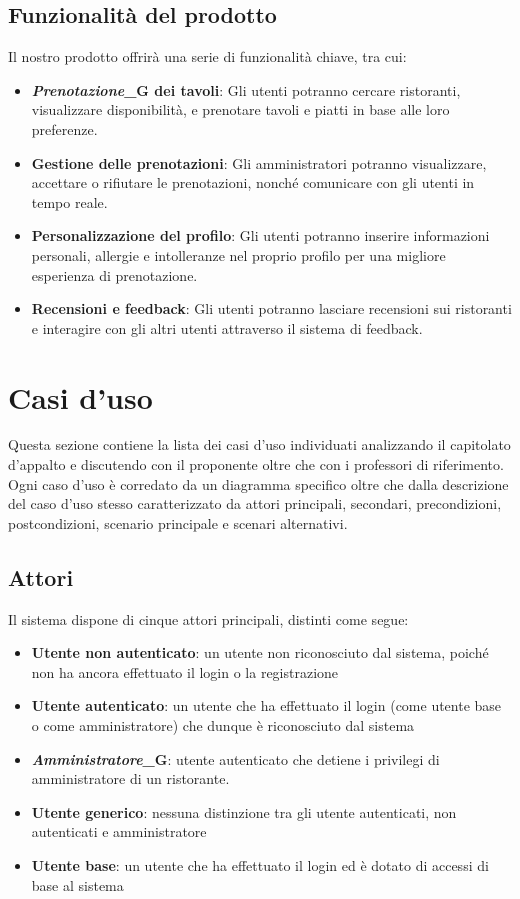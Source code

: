 \documentclass[12pt, oneside]{article}
\begin{document}
\subsection{Funzionalità del prodotto}
Il nostro prodotto offrirà una serie di funzionalità chiave, tra cui:
\begin{itemize}
\item \textbf{\textit{Prenotazione}_G dei tavoli}: Gli utenti potranno cercare ristoranti, visualizzare disponibilità, e prenotare tavoli e piatti in base alle loro preferenze.
\item \textbf{Gestione delle prenotazioni}: Gli amministratori potranno visualizzare, accettare o rifiutare le prenotazioni, nonché comunicare con gli utenti in tempo reale.
\item \textbf{Personalizzazione del profilo}: Gli utenti potranno inserire informazioni personali, allergie e intolleranze nel proprio profilo per una migliore esperienza di prenotazione.
\item \textbf{Recensioni e feedback}: Gli utenti potranno lasciare recensioni sui ristoranti e interagire con gli altri utenti attraverso il sistema di feedback.
\end{itemize}


\newpage

\section{Casi d'uso}
Questa sezione contiene la lista dei casi d'uso individuati analizzando il capitolato d'appalto e discutendo con il proponente oltre che con i professori di riferimento. Ogni caso d'uso è corredato da un diagramma specifico oltre che dalla descrizione del caso d'uso stesso caratterizzato da attori principali, secondari, precondizioni, postcondizioni, scenario principale e scenari alternativi.
\subsection{Attori}
Il sistema dispone di cinque attori principali, distinti come segue:
\begin{itemize}
    \item \textbf{Utente non autenticato}: un utente non riconosciuto dal sistema, poiché non ha ancora  effettuato il login o la registrazione
    \item \textbf{Utente autenticato}: un utente che ha effettuato il login (come utente base o come amministratore) che dunque è riconosciuto dal sistema
    \item \textbf{\textit{Amministratore}_G}: utente autenticato che detiene i privilegi di amministratore di un ristorante.
    \item \textbf{Utente generico}: nessuna distinzione tra gli utente autenticati, non autenticati e amministratore
    \item \textbf{Utente base}: un utente che ha effettuato il login ed è dotato di accessi di base al sistema
\end{itemize}
\end{document}
